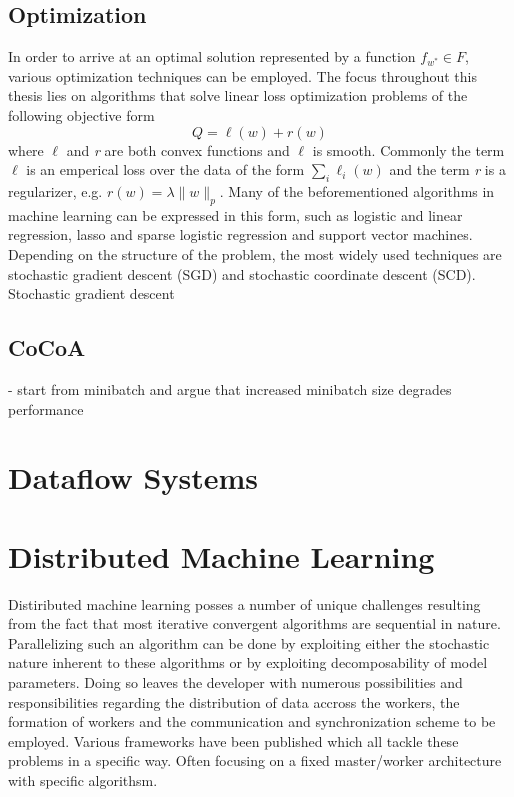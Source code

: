 \subsection{Optimization}
\label{ss:optimization}
In order to arrive at an optimal solution represented by a function $f_{w^*} \in F$, various optimization techniques can be employed.
The focus throughout this thesis lies on algorithms that solve linear loss optimization problems of the following objective form
\begin{equation}
Q = \textit{$\ell$}(w) + \textit{r}(w)
\label{eqn:lin_loss}
\end{equation}
where $\ell$ and \textit{r} are both convex functions and $\ell$ is smooth. Commonly the term \textit{$\ell$} is an emperical loss over the data of the form $\sum_{i} \ell_{i}(w)$ and the term \textit{r} is a regularizer, e.g. $\textit{r}(w) = \lambda\|w\|_p$. Many of the beforementioned algorithms in machine learning can be expressed in this form, such as logistic and linear regression, lasso and sparse logistic regression and support vector machines.
Depending on the structure of the problem, the most widely used techniques are stochastic gradient descent (SGD) and stochastic coordinate descent (SCD).
Stochastic gradient descent 

\subsection{CoCoA}
- start from minibatch and argue that increased minibatch size degrades performance

\section{Dataflow Systems}
\label{s:dataflow}


\section{Distributed Machine Learning}
\label{s:distributed_ml}
Distiributed machine learning posses a number of unique challenges resulting from the fact that most iterative convergent algorithms are sequential in nature. Parallelizing such an algorithm can be done by exploiting either the stochastic nature inherent to these algorithms or by exploiting decomposability of model parameters. Doing so leaves the developer with numerous possibilities and responsibilities regarding the distribution of data accross the workers, the formation of workers and the communication and synchronization scheme to be employed. Various frameworks have been published which all tackle these problems in a specific way. Often focusing on a fixed master/worker architecture with specific algorithsm.

